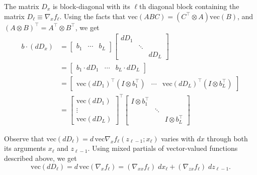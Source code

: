 \documentclass{article}
\begin{document}
The matrix $D_x$ is block-diagonal with its $\ell$th diagonal block containing the matrix $D_\ell \equiv \nabla_x
    f_\ell$. Using the facts that $\mathrm{vec}(ABC) = \left(C^\top \otimes A \right) \mathrm{vec}(B)$, and $(A\otimes
    B)^\top = A^\top \otimes B^\top$, we get
\begin{align}
    b\cdot (dD_x) & =
    \begin{bmatrix}
        b_1 & \cdots & b_L
    \end{bmatrix}
    \begin{bmatrix}
        dD_1 &        &      \\
             & \ddots &      \\
             &        & dD_L
    \end{bmatrix}
    \nonumber                                                                              \\
    & = \begin{bmatrix}
        b_1 \cdot dD_1 & \cdots & b_L \cdot dD_L
    \end{bmatrix}
    \nonumber                                                                              \\
    & = \begin{bmatrix}
        \mathrm{vec}\left(dD_1\right)^\top \left(I \otimes b_1^\top\right) &
        \cdots                                                             &
        \mathrm{vec}\left(dD_L\right)^\top \left(I \otimes b_L^\top\right)
    \end{bmatrix}
    \nonumber                                                                              \\
    & = \begin{bmatrix}
        \mathrm{vec}\left(dD_1\right) \\
        \vdots                        \\
        \mathrm{vec}\left(dD_L\right)
    \end{bmatrix}
    ^\top
    \begin{bmatrix}
        I \otimes b_1^\top &        &                    \\
                           & \ddots &                    \\
                           &        & I \otimes b_L^\top
    \end{bmatrix}
\end{align}

Observe that $\mathrm{vec}\left(dD_\ell\right) = d\,\mathrm{vec} \nabla_x f_\ell(z_{\ell-1}; x_\ell)$ varies with $dx$
through both its arguments $x_\ell$ and $z_{\ell-1}$. Using mixed partials of vector-valued functions described above,
we get
\begin{equation}
    \mathrm{vec} \left(dD_\ell\right) = d\,\mathrm{vec}\left(\nabla_x f_\ell\right) = \left(\nabla_{xx} f_\ell\right)\; dx_\ell  + \left(\nabla_{zx} f_\ell\right)\; dz_{\ell-1}.
\end{equation}
\end{document}

